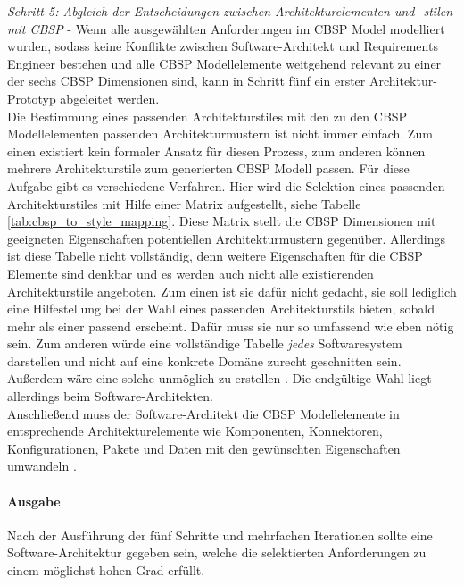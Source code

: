 \emph{Schritt 5: Abgleich der Entscheidungen zwischen Architekturelementen und -stilen mit CBSP} - 
Wenn alle ausgew\"ahlten Anforderungen im CBSP Model modelliert wurden, sodass keine Konflikte zwischen Software-Architekt und Requirements Engineer bestehen und alle CBSP Modellelemente weitgehend relevant zu einer der sechs CBSP Dimensionen sind, kann in Schritt f\"unf ein erster Architektur-Prototyp abgeleitet werden. \\
Die Bestimmung eines passenden Architekturstiles mit den zu den CBSP Modellelementen passenden Architekturmustern ist nicht immer einfach. Zum einen existiert kein formaler Ansatz f\"ur diesen Prozess, zum anderen k\"onnen mehrere Architekturstile zum generierten CBSP Modell passen. F\"ur diese Aufgabe gibt es verschiedene Verfahren. Hier wird die Selektion eines passenden Architekturstiles mit Hilfe einer Matrix aufgestellt, siehe Tabelle \ref{tab:cbsp_to_style_mapping}. Diese Matrix stellt die CBSP Dimensionen mit geeigneten Eigenschaften potentiellen Architekturmustern gegen\"uber. Allerdings ist diese Tabelle nicht vollst\"andig, denn weitere Eigenschaften f\"ur die CBSP Elemente sind denkbar und es werden auch nicht alle existierenden Architekturstile angeboten. Zum einen ist sie daf\"ur nicht gedacht, sie soll lediglich eine Hilfestellung bei der Wahl eines passenden Architekturstils bieten, sobald mehr als einer passend erscheint. Daf\"ur muss sie nur so umfassend wie eben n\"otig sein. Zum anderen w\"urde eine vollst\"andige Tabelle \textit{jedes} Softwaresystem darstellen und nicht auf eine konkrete Dom\"ane zurecht geschnitten sein. Au\ss{}erdem w\"are eine solche unm\"oglich zu erstellen \cite{Gru01}. Die endg\"ultige Wahl liegt allerdings beim Software-Architekten. \\

Anschlie\ss{}end muss der Software-Architekt die CBSP Modellelemente in entsprechende Architekturelemente wie Komponenten, Konnektoren, Konfigurationen, Pakete und Daten mit den gew\"unschten Eigenschaften umwandeln \cite{Gru01}. \\

\paragraph{Ausgabe}

Nach der Ausf\"uhrung der f\"unf Schritte und mehrfachen Iterationen sollte eine Software-Architektur gegeben sein, welche die selektierten Anforderungen zu einem m\"oglichst hohen Grad erf\"ullt.


